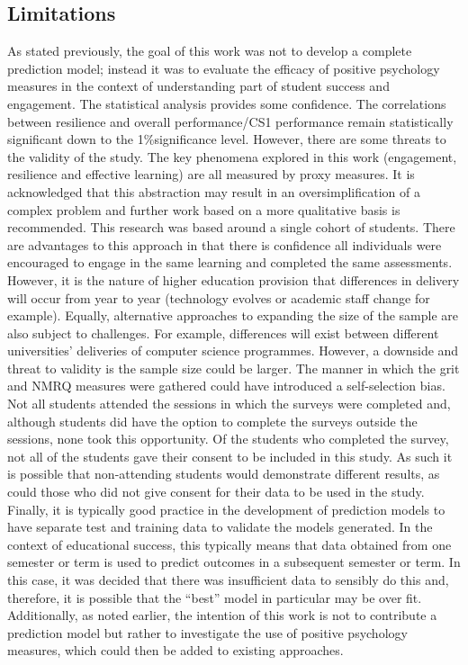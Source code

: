 \documentclass[sigconf]{acmart}
\begin{document}
\subsection {Limitations}
As stated previously, the goal of this work was not to develop a complete prediction model; instead it was to evaluate the efficacy of positive psychology measures in the context of understanding part of student success and engagement. The statistical analysis provides some confidence. The correlations between resilience and overall performance/CS1 performance remain statistically significant down to the 1\%significance level. However, there are some threats to the validity of the study. The key phenomena explored in this work (engagement, resilience and effective learning) are all measured by proxy measures. It is acknowledged that this abstraction may result in an oversimplification of a complex problem and further work based on a more qualitative basis is recommended. This research was based around a single cohort of students. There are advantages to this approach in that there is confidence all individuals were encouraged to engage in the same learning and completed the same assessments. However, it is the nature of higher education provision that differences in delivery will occur from year to year (technology evolves or academic staff change for example). Equally, alternative approaches to expanding the size of the sample are also subject to challenges. For example, differences will exist between different universities' deliveries of computer science programmes. However, a downside and threat to validity is the sample size could be larger. The manner in which the grit and NMRQ measures were gathered could have introduced a self-selection bias. Not all students attended the sessions in which the surveys were completed and, although students did have the option to complete the surveys outside the sessions, none took this opportunity. Of the students who completed the survey, not all of the students gave their consent to be included in this study. As such it is possible that non-attending students would demonstrate different results, as could those who did not give consent for their data to be used in the study. Finally, it is typically good practice in the development of prediction models to have separate test and training data to validate the models generated. In the context of educational success, this typically means that data obtained from one semester or term is used to predict outcomes in a subsequent semester or term. In this case, it was decided that there was insufficient data to sensibly do this and, therefore, it is possible that the ``best'' model in particular may be over fit. Additionally, as noted earlier, the intention of this work is not to contribute a prediction model but rather to investigate the use of positive psychology measures, which could then be added to existing approaches.
\end{document}
